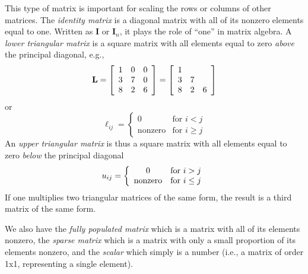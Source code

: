 This type of matrix is important for scaling the rows or columns of other matrices.  The \emph{identity 
matrix} is a diagonal matrix with all of its nonzero elements equal to one. Written as $\mathbf{I}$ or $\mathbf{I}_n$,
it plays the role of ``one'' in matrix algebra.
A \emph{lower triangular matrix} is a square 
matrix with all elements equal to zero \emph{above} the principal diagonal, e.g.,
\begin{equation}
	\index{Matrix!lower triangular}
	\index{Lower triangular matrix}
\mathbf{L} = \left [ \begin{array}{ccc}
1 & 0 & 0 \\
3 & 7 & 0 \\
8 & 2 & 6
\end{array}
\right ] =
\left[ \begin{array}{ccc}
1 \\
3 & 7 \\
8 & 2 & 6 \end{array} \right]
\end{equation}
or
\begin{equation}
\ell_{ij} = \left \{ \begin{array}
{cl}
0 & \mbox{for } i < j\\
\mbox{nonzero} & \mbox{for } i \geq j 
\end{array} \right .
\end{equation}	 
An \emph{upper triangular matrix} is thus a square matrix with all elements equal to zero \emph{below} the principal 
diagonal
\begin{equation}
	\index{Matrix!upper triangular}
	\index{Upper triangular matrix}
u_{ij} = \left \{ \begin{array}{cl}
0 & \mbox{for } i > j\\
\mbox{nonzero} & \mbox{for } i \leq j 
\end{array} \right .
\end{equation}
If one multiplies two triangular matrices of the same form, the result is a third matrix of the same 
form.

	We also have the \emph{fully populated matrix} which is a matrix with all of its elements nonzero, 
the \emph{sparse matrix} which is a matrix with only a small proportion of its elements nonzero, and the \emph{scalar} 
which simply is a number (i.e., a matrix of order 1x1, representing a single element).

